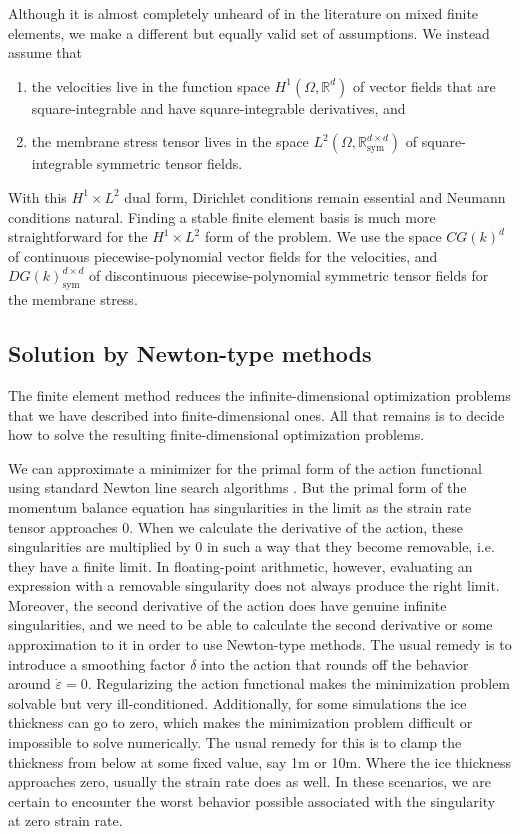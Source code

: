 \documentclass[review,oneside]{igs}
\begin{document}
Although it is almost completely unheard of in the literature on mixed finite elements, we make a different but equally valid set of assumptions.
We instead assume that
\begin{enumerate}
    \item the velocities live in the function space $H^1(\Omega, \mathbb{R}^d)$ of vector fields that are square-integrable and have square-integrable derivatives, and
    \item the membrane stress tensor lives in the space $L^2(\Omega, \mathbb{R}^{d \times d}_{\text{sym}})$ of square-integrable symmetric tensor fields.
\end{enumerate}
With this $H^1 \times L^2$ dual form, Dirichlet conditions remain essential and Neumann conditions natural.
Finding a stable finite element basis is much more straightforward for the $H^1\times L^2$ form of the problem.
We use the space $CG(k)^d$ of continuous piecewise-polynomial vector fields for the velocities, and $DG(k)^{d\times d}_{\text{sym}}$ of discontinuous piecewise-polynomial symmetric tensor fields for the membrane stress.



\subsection{Solution by Newton-type methods}
\label{app:solution}

The finite element method reduces the infinite-dimensional optimization problems that we have described into finite-dimensional ones.
All that remains is to decide how to solve the resulting finite-dimensional optimization problems.

We can approximate a minimizer for the primal form of the action functional using standard Newton line search algorithms \citep{shapero2021icepack}.
But the primal form of the momentum balance equation has singularities in the limit as the strain rate tensor approaches 0.
When we calculate the derivative of the action, these singularities are multiplied by 0 in such a way that they become removable, i.e. they have a finite limit.
In floating-point arithmetic, however, evaluating an expression with a removable singularity does not always produce the right limit.
Moreover, the second derivative of the action does have genuine infinite singularities, and we need to be able to calculate the second derivative or some approximation to it in order to use Newton-type methods.
The usual remedy is to introduce a smoothing factor $\delta$ into the action that rounds off the behavior around $\dot\varepsilon = 0$.
Regularizing the action functional makes the minimization problem solvable but very ill-conditioned.
Additionally, for some simulations the ice thickness can go to zero, which makes the minimization problem difficult or impossible to solve numerically.
The usual remedy for this is to clamp the thickness from below at some fixed value, say 1m or 10m.
Where the ice thickness approaches zero, usually the strain rate does as well.
In these scenarios, we are certain to encounter the worst behavior possible associated with the singularity at zero strain rate.
\end{document}

